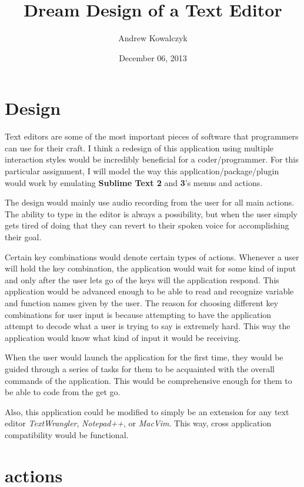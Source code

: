 \documentclass[11pt, oneside]{article}
\title{Dream Design of a Text Editor}
\author{Andrew Kowalczyk}
\date{December 06, 2013}
\begin{document}
\maketitle


\section{Design}

Text editors are some of the most important pieces of software that programmers can use for their craft. I think a redesign of this application using multiple interaction styles would be incredibly beneficial for a coder/programmer. For this particular assignment, I will model the way this application/package/plugin would work by emulating \textbf{Sublime Text 2} and \textbf{3}'s menus and actions.

The design would mainly use audio recording from the user for all main actions. The ability to type in the editor is always a possibility, but when the user simply gets tired of doing that they can revert to their spoken voice for accomplishing their goal.

Certain key combinations would denote certain types of actions. Whenever a user will hold the key combination, the application would wait for some kind of input and only after the user lets go of the keys will the application respond. This application would be advanced enough to be able to read and recognize variable and function names given by the user. The reason for choosing different key combinations for user input is because attempting to have the application attempt to decode what a user is trying to say is extremely hard. This way the application would know what kind of input it would be receiving.

When the user would launch the application for the first time, they would be guided through a series of tasks for them to be acquainted with the overall commands of the application. This would be comprehensive enough for them to be able to code from the get go.

Also, this application could be modified to simply be an extension for any text editor \textit{TextWrangler}, \textit{Notepad++}, or \textit{MacVim}. This way, cross application compatibility would be functional.

\section{ actions}
\end{document}
